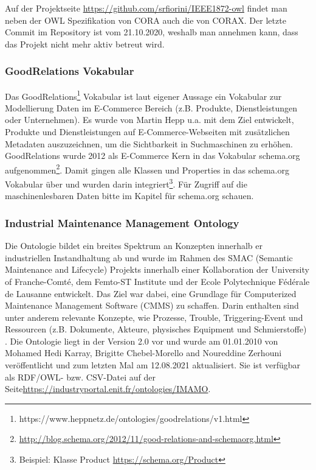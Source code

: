 \documentclass{article}
\begin{document}
Auf der Projektseite \url{https://github.com/srfiorini/IEEE1872-owl} findet man neben der OWL Spezifikation von CORA auch die von CORAX. Der letzte Commit im Repository ist vom 21.10.2020, weshalb man annehmen kann, dass das Projekt nicht mehr aktiv betreut wird.

\subsubsection{GoodRelations Vokabular}

Das GoodRelations\footnote{https://www.heppnetz.de/ontologies/goodrelations/v1.html} Vokabular ist laut eigener Aussage ein Vokabular zur Modellierung Daten im E-Commerce Bereich (z.B. Produkte, Dienstleistungen oder Unternehmen).
Es wurde von Martin Hepp u.a. mit dem Ziel entwickelt, Produkte und Dienstleistungen auf E-Commerce-Webseiten mit zusätzlichen Metadaten auszuzeichnen, um die Sichtbarkeit in Suchmaschinen zu erhöhen.
GoodRelations wurde 2012 als E-Commerce Kern in das Vokabular schema.org aufgenommen\footnote{\url{http://blog.schema.org/2012/11/good-relations-and-schemaorg.html}}.
Damit gingen alle Klassen und Properties in das schema.org Vokabular über und wurden darin integriert\footnote{Beispiel: Klasse Product \url{https://schema.org/Product}}.
Für Zugriff auf die maschinenlesbaren Daten bitte im Kapitel für schema.org schauen.

\subsubsection{Industrial Maintenance Management Ontology}
Die Ontologie bildet ein breites Spektrum an Konzepten innerhalb er industriellen Instandhaltung ab und wurde im Rahmen des SMAC (Semantic Maintenance and Lifecycle) Projekts innerhalb einer Kollaboration der University of Franche-Comté, dem Femto-ST Institute und der Ecole Polytechnique Fédérale de Lausanne entwickelt.
Das Ziel war dabei, eine Grundlage für Computerized Maintenance Management Software (CMMS) zu schaffen. 
Darin enthalten sind unter anderem relevante Konzepte, wie Prozesse, Trouble, Triggering-Event und Ressourcen (z.B. Dokumente, Akteure, physisches Equipment und Schmierstoffe) \cite{karray2012formal}.
Die Ontologie liegt in der Version 2.0 vor und wurde am 01.01.2010 von Mohamed Hedi Karray, Brigitte Chebel-Morello and Noureddine Zerhouni veröffentlicht und zum letzten Mal am 12.08.2021 aktualisiert. 
Sie ist verfügbar als RDF/OWL- bzw. CSV-Datei auf der Seite\url{https://industryportal.enit.fr/ontologies/IMAMO}.
\end{document}
